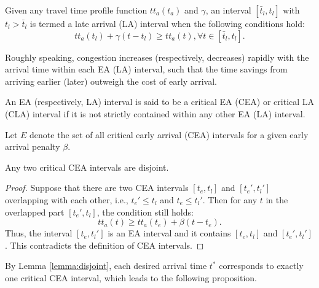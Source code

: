 \begin{definition}
    Given any travel time profile function $tt_a(t_a)$ and \( \gamma\), an interval $[\bar t_l, t_l]$ with $t_l >\bar t_l$ is termed a late arrival (LA) interval when the following conditions hold:
    \begin{equation}\label{eq:decrease_faster}
        tt_a(t_l)  + \gamma  (t - t_l ) \ge  tt_a(t ), \forall  t \in [\bar  t_l, t_l].
\end{equation} 
 
\end{definition}

Roughly speaking, congestion increases (respectively, decreases) rapidly with the arrival time within each EA (LA) interval, such that the time savings from arriving earlier (later) outweigh the cost of early arrival. 

\begin{definition}
 An EA (respectively, LA) interval is said to be a critical EA (CEA) or critical LA (CLA) interval if it is not strictly contained within any other EA (LA) interval.
\end{definition}

Let $E$ denote the set of all critical early arrival (CEA) intervals for a given early arrival penalty $\beta$.


\begin{lemma}\label{lemma:disjoint}
Any two critical CEA intervals are disjoint.



\end{lemma}

\begin{proof}
Suppose that there are two CEA intervals $[t_e, t_l]$ and $[t_e', t_l']$ overlapping with each other, i.e., $t_e' \le t_l$ and $t_e \le t_l'$. Then for any $t$ in the overlapped part $[t_e', t_l]$, the condition still holds: 
$$
tt_a(t ) \ge tt_a(t_e)  + \beta (t - t_e ).
$$
Thus, the interval $[t_e, t_l']$ is an EA interval and it contains  $[t_e, t_l]$ and $[t_e', t_l']$. This contradicts the definition of CEA intervals.
\end{proof}

By Lemma \ref{lemma:disjoint}, each desired arrival time $t^*$ corresponds to exactly one critical CEA interval, which leads to the following proposition. 

